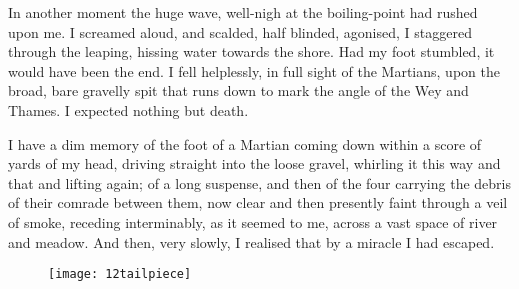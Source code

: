 In another moment the huge wave, well-nigh at the boiling-point had rushed upon me. I screamed aloud, and scalded, half blinded, agonised, I staggered through the leaping, hissing water towards the shore. Had my foot stumbled, it would have been the end. I fell helplessly, in full sight of the Martians, upon the broad, bare gravelly spit that runs down to mark the angle of the Wey and Thames. I expected nothing but death.

I have a dim memory of the foot of a Martian coming down within a score of yards of my head, driving straight into the loose gravel, whirling it this way and that and lifting again; of a long suspense, and then of the four carrying the debris of their comrade between them, now clear and then presently faint through a veil of smoke, receding interminably, as it seemed to me, across a vast space of river and meadow. And then, very slowly, I realised that by a miracle I had escaped.

\begin{figure}[b!]
\centering
\texttt{[image: 12tailpiece]}
\end{figure}